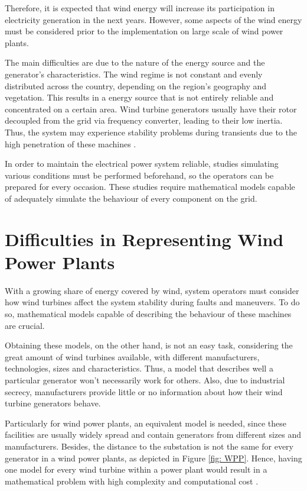 Therefore, it is expected that wind energy will increase its participation in electricity generation in the next years. However, some aspects of the wind energy must be considered prior to the implementation on large scale of wind power plants.

The main difficulties are due to the nature of the energy source and the generator's characteristics. The wind regime is not constant and evenly distributed across the country, depending on the region's geography and vegetation. This results in a energy source that is not entirely reliable and concentrated on a certain area. Wind turbine generators usually have their rotor decoupled from the grid via frequency converter, leading to their low inertia. Thus, the system may experience stability problems during transients due to the high penetration of these machines \cite{Xiong2019}.

In order to maintain the electrical power system reliable, studies simulating various conditions must be performed beforehand, so the operators can be prepared for every occasion. These studies require mathematical models capable of adequately simulate the behaviour of every component on the grid.

\section{Difficulties in Representing Wind Power Plants}

With a growing share of energy covered by wind, system operators must consider how wind turbines affect the system stability during faults and maneuvers. To do so, mathematical models capable of describing the behaviour of these machines are crucial. 

Obtaining these models, on the other hand, is not an easy task, considering the great amount of wind turbines available, with different manufacturers, technologies, sizes and characteristics. Thus, a model that describes well a particular generator won't necessarily work for others. Also, due to industrial secrecy, manufacturers provide little or no information about how their wind turbine generators behave. 

Particularly for wind power plants, an equivalent model is needed, since these facilities are usually widely spread and contain generators from different sizes and manufacturers. Besides, the distance to the substation is not the same for every generator in a wind power plants, as depicted in Figure \ref{fig: WPP}. Hence, having one model for every wind turbine within a power plant would result in a mathematical problem with high complexity and computational cost \cite{Erlich2012}.

